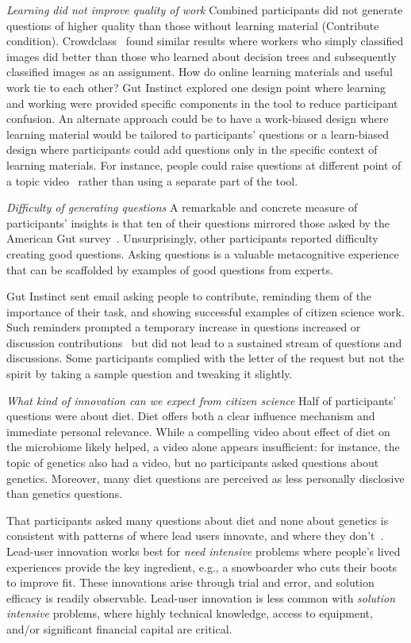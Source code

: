 \textit{Learning did not improve quality of work}
Combined participants did not generate questions of higher quality than those without learning material (Contribute condition). Crowdclass~\cite{Lee2016} found similar results where workers who simply classified images did better than those who learned about decision trees and subsequently classified images as an assignment. How do online learning materials and useful work tie to each other? Gut Instinct explored one design point where learning and working were provided specific components in the tool to reduce participant confusion. An alternate approach could be to have a work-biased design where learning material would be tailored to participants’ questions or a learn-biased design where participants could add questions only in the specific context of learning materials. For instance, people could raise questions at different point of a topic video~\cite{Lee2015b} rather than using a separate part of the tool.
 
\textit{Difficulty of generating questions}
A remarkable and concrete measure of participants’ insights is that ten of their questions mirrored those asked by the American Gut survey~\cite{KnightLab2016}. Unsurprisingly, other participants reported difficulty creating good questions. Asking questions is a valuable metacognitive experience that can be scaffolded by examples of good questions from experts. 

Gut Instinct sent email asking people to contribute, reminding them of the importance of their task, and showing successful examples of citizen science work. Such reminders 
prompted a temporary increase in questions increased or discussion contributions~\cite{Kotturi2015} but did not lead to a sustained stream of questions and discussions. Some participants complied with the letter of the request but not the spirit by taking a sample question and tweaking it slightly.

\textit{What kind of innovation can we expect from citizen science}
Half of participants’ questions were about diet. Diet offers both a clear influence mechanism and immediate personal relevance. While a compelling video about effect of diet on the microbiome likely helped, a video alone appears insufficient: for instance, the topic of genetics also had a video, but no participants asked questions about genetics. Moreover, many diet questions are perceived as less personally disclosive than genetics questions.
 
That participants asked many questions about diet and none about genetics is consistent with patterns of where lead users innovate, and where they don’t~\cite{VonHippel2005a}. Lead-user innovation works best for \textit{need intensive} problems where people’s lived experiences provide the key ingredient, e.g., a snowboarder who cuts their boots to improve fit. These innovations arise through trial and error, and solution efficacy is readily observable. Lead-user innovation is less common with \textit{solution intensive} problems, where highly technical knowledge, access to equipment, and/or significant financial capital are critical. 
 
